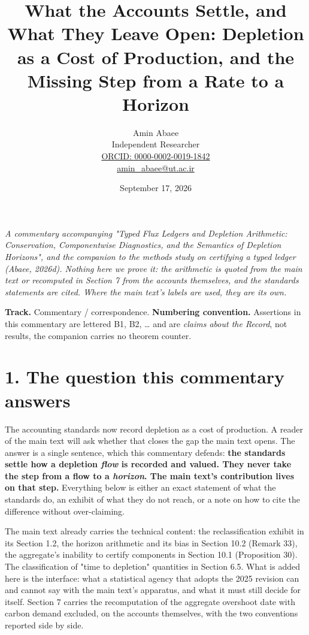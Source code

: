 \documentclass[11pt]{article}
\begin{document}
\title{What the Accounts Settle, and What They Leave Open: Depletion as a Cost of Production, and the Missing Step from a Rate to a Horizon}
\author{Amin Abaee\\[0.35em]
{\small Independent Researcher}\\[0.55em]
{\small\href{https://orcid.org/\allowbreak{}0000-0002-0019-1842}{ORCID: 0000-0002-0019-1842}}\\[0.3em]
{\small\href{mailto:amin\_abaee@ut.ac.ir}{amin\_abaee@ut.ac.ir}}}
\date{September 17, 2026}
\maketitle

\emph{A commentary accompanying "Typed Flux Ledgers and Depletion Arithmetic: Conservation, Componentwise Diagnostics, and the Semantics of Depletion Horizons", and the companion to the methods study on certifying a typed ledger (Abaee, 2026d). Nothing here we prove it: the arithmetic is quoted from the main text or recomputed in Section 7 from the accounts themselves, and the standards statements are cited. Where the main text's labels are used, they are its own.}

\textbf{Track.} Commentary / correspondence. \textbf{Numbering convention.} Assertions in this commentary are lettered B1, B2, \ldots{} and are \emph{claims about the Record}, not results, the companion carries no theorem counter.

\vspace{0.8em}

\section*{1. The question this commentary answers}\label{1-the-question-this-commentary-answers}

The accounting standards now record depletion as a cost of production. A reader of the main text will ask whether that closes the gap the main text opens. The answer is a single sentence, which this commentary defends: \textbf{the standards settle how a depletion \emph{flow} is recorded and valued. They never take the step from a flow to a \emph{horizon}. The main text's contribution lives on that step.} Everything below is either an exact statement of what the standards do, an exhibit of what they do not reach, or a note on how to cite the difference without over-claiming.

The main text already carries the technical content: the reclassification exhibit in its Section 1.2, the horizon arithmetic and its bias in Section 10.2 (Remark 33), the aggregate's inability to certify components in Section 10.1 (Proposition 30). The classification of "time to depletion" quantities in Section 6.5. What is added here is the interface: what a statistical agency that adopts the 2025 revision can and cannot say with the main text's apparatus, and what it must still decide for itself. Section 7 carries the recomputation of the aggregate overshoot date with carbon demand excluded, on the accounts themselves, with the two conventions reported side by side.
\end{document}
